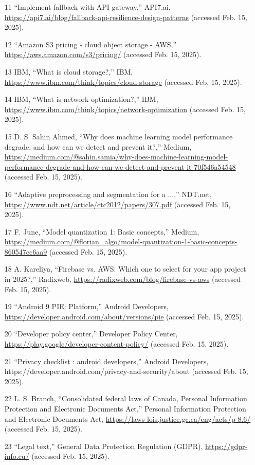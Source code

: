 \documentclass[]{article}
\begin{document}
\begin{itemize}
	\item[11] “Implement fallback with API gateway,” API7.ai, \url{https://api7.ai/blog/fallback-api-resilience-design-patterns} (accessed Feb. 15, 2025).
	\item[12] “Amazon S3 pricing - cloud object storage - AWS,” \url{https://aws.amazon.com/s3/pricing/} (accessed Feb. 15, 2025).
	\item[13] IBM, “What is cloud storage?,” IBM, \url{https://www.ibm.com/think/topics/cloud-storage} (accessed Feb. 15, 2025).
	\item[14] IBM, “What is network optimization?,” IBM, \url{https://www.ibm.com/think/topics/network-optimization} (accessed Feb. 15, 2025).
	\item[15] D. S. Sahin Ahmed, “Why does machine learning model performance degrade, and how can we detect and prevent it?,” Medium, \url{https://medium.com/@sahin.samia/why-does-machine-learning-model-performance-degrade-and-how-can-we-detect-and-prevent-it-70f546a54548} (accessed Feb. 15, 2025).
	\item[16] “Adaptive preprocessing and segmentation for a ...,” NDT.net, \url{https://www.ndt.net/article/ctc2012/papers/307.pdf} (accessed Feb. 15, 2025).
	\item[17] F. June, “Model quantization 1: Basic concepts,” Medium, \url{https://medium.com/@florian_algo/model-quantization-1-basic-concepts-860547ec6aa9} (accessed Feb. 15, 2025).
	\item[18] A. Kareliya, “Firebase vs. AWS: Which one to select for your app project in 2025?,” Radixweb, \url{https://radixweb.com/blog/firebase-vs-aws} (accessed Feb. 15, 2025).
	\item[19] “Android 9 PIE: Platform,” Android Developers, \url{https://developer.android.com/about/versions/pie} (accessed Feb. 15, 2025).
	\item[20] “Developer policy center,” Developer Policy Center, \url{https://play.google/developer-content-policy/} (accessed Feb. 15, 2025).
	\item[21] “Privacy checklist  :   android developers,” Android Developers, https://developer.android.com/privacy-and-security/about (accessed Feb. 15, 2025). 
	\item[22] L. S. Branch, “Consolidated federal laws of Canada, Personal Information Protection and Electronic Documents Act,” Personal Information Protection and Electronic Documents Act, \url{https://laws-lois.justice.gc.ca/eng/acts/p-8.6/} (accessed Feb. 15, 2025).
	\item[23] “Legal text,” General Data Protection Regulation (GDPR), \url{https://gdpr-info.eu/} (accessed Feb. 15, 2025).

\end{itemize}
\end{document}
